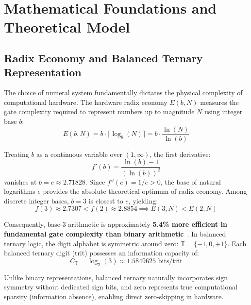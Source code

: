 \documentclass[11pt,a4paper]{article}
\begin{document}
\section{Mathematical Foundations and Theoretical Model}

\subsection{Radix Economy and Balanced Ternary Representation}

The choice of numeral system fundamentally dictates the physical complexity of computational hardware. The hardware radix economy $E(b, N)$ measures the gate complexity required to represent numbers up to magnitude $N$ using integer base $b$:
\begin{equation}
E(b, N) = b \cdot \lceil \log_b(N) \rceil = b \cdot \frac{\ln(N)}{\ln(b)}
\end{equation}

Treating $b$ as a continuous variable over $(1, \infty)$, the first derivative:
\begin{equation}
f'(b) = \frac{\ln(b) - 1}{(\ln(b))^2}
\end{equation}
vanishes at $b = e \approx 2.71828$. Since $f''(e) = 1/e > 0$, the base of natural logarithms $e$ provides the absolute theoretical optimum of radix economy. Among discrete integer bases, $b = 3$ is closest to $e$, yielding:
\begin{equation}
f(3) \approx 2.7307 < f(2) \approx 2.8854 \implies E(3, N) < E(2, N)
\end{equation}

Consequently, base-3 arithmetic is approximately \textbf{5.4\% more efficient in fundamental gate complexity than binary arithmetic}~\cite{knuth1997art}. In balanced ternary logic, the digit alphabet is symmetric around zero: $\mathbb{T} = \{-1, 0, +1\}$. Each balanced ternary digit (trit) possesses an information capacity of:
\begin{equation}
C_{\mathbb{T}} = \log_2(3) \approx 1.5849625 \text{ bits/trit}
\end{equation}

Unlike binary representations, balanced ternary naturally incorporates sign symmetry without dedicated sign bits, and zero represents true computational sparsity (information absence), enabling direct zero-skipping in hardware.
\end{document}
